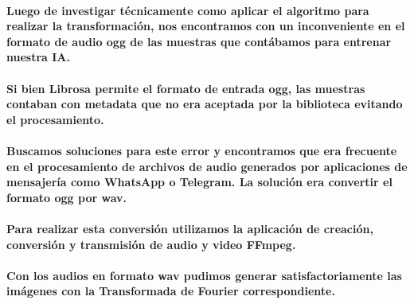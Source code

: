 \documentclass[a4paper,11pt,twocolumn]{article}
\begin{document}
\paragraph{Luego de investigar técnicamente como aplicar el algoritmo para realizar la transformación, nos encontramos con un inconveniente en el formato de audio ogg de las muestras que contábamos para entrenar nuestra IA.}
\paragraph{Si bien Librosa permite el formato de entrada ogg, las muestras contaban con metadata que no era aceptada por la biblioteca evitando el procesamiento.}
\paragraph{Buscamos soluciones para este error y encontramos que era frecuente en el procesamiento de archivos de audio generados por aplicaciones de mensajería como WhatsApp o Telegram. La solución era convertir el formato ogg por wav.}
\paragraph{Para realizar esta conversión utilizamos la aplicación de creación, conversión y transmisión de audio y video FFmpeg.}
\paragraph{Con los audios en formato wav pudimos generar satisfactoriamente las imágenes con la Transformada de Fourier correspondiente.}
\printbibliography
\end{document}
